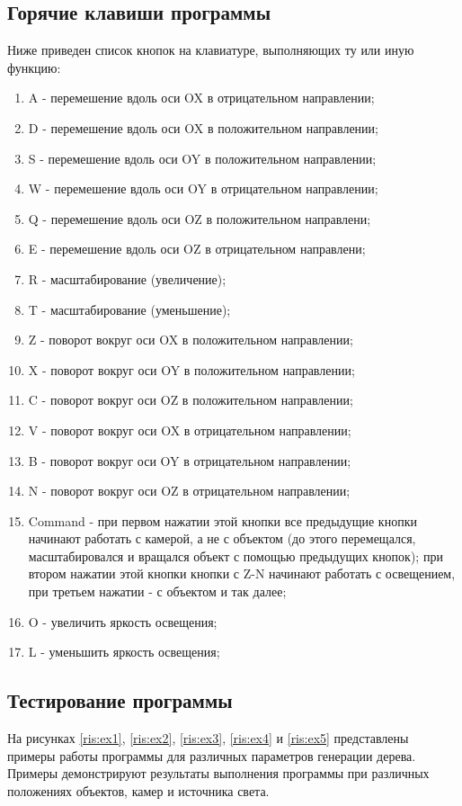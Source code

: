 \documentclass[54pt, a4paper]{article}
\begin{document}
	\subsection{Горячие клавиши программы} \label{print}
	Ниже приведен список кнопок на клавиатуре, выполняющих ту или иную функцию:
	\begin{enumerate}
		\item A - перемешение вдоль оси OX в отрицательном направлении;
		\item D - перемешение вдоль оси OX в положительном направлении;
		\item S - перемешение вдоль оси OY в положительном направлении;
		\item W - перемешение вдоль оси OY в отрицательном направлении;
		\item Q - перемешение вдоль оси OZ в положительном направлени;
		\item E - перемешение вдоль оси OZ в отрицательном направлени;
		\item R - масштабирование (увеличение);
		\item T - масштабирование (уменьшение);
		\item Z - поворот вокруг оси OX в положительном направлении;
		\item X - поворот вокруг оси OY в положительном направлении;
		\item C - поворот вокруг оси OZ в положительном направлении;
		\item V - поворот вокруг оси OX в отрицательном направлении;
		\item B - поворот вокруг оси OY в отрицательном направлении;
		\item N - поворот вокруг оси OZ в отрицательном направлении;
		\item Command - при первом нажатии этой кнопки все предыдущие кнопки начинают работать с камерой, а не с объектом (до этого перемещался, масштабировался и вращался объект с помощью предыдущих кнопок); при втором нажатии этой кнопки кнопки с Z-N начинают работать с освещением, при третьем нажатии - с объектом и так далее; 
		\item O - увеличить яркость освещения;
		\item L - уменьшить яркость освещения;
	\end{enumerate}
	
	\subsection{Тестирование программы}
	На рисунках \ref{ris:ex1}, \ref{ris:ex2}, \ref{ris:ex3}, \ref{ris:ex4} и \ref{ris:ex5} представлены примеры работы программы для различных параметров генерации дерева. Примеры демонстрируют результаты выполнения программы при различных положениях объектов, камер и источника света. 
	
\end{document}

